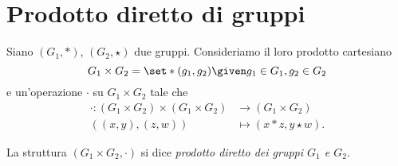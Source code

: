 \section{Prodotto diretto di gruppi}

\begin{definition}
    Siano $(G_1, *)$, $(G_2, \star)$ due gruppi. Consideriamo il loro prodotto cartesiano \[
        G_1 \times G_2 = \set*{(g_1, g_2) \given g_1 \in G_1, g_2 \in G_2}    
    \] e un'operazione $\cdot$ su $G_1 \times G_2$ tale che \begin{align*}
    \cdot : (G_1 \times G_2) \times (G_1 \times G_2) &\to (G_1 \times G_2)\\
    ((x, y), (z, w)) &\mapsto (x * z, y \star w).
    \end{align*}
    
    La struttura $(G_1 \times G_2, \cdot)$ si dice \emph{prodotto diretto dei gruppi $G_1$ e $G_2$}.
\end{definition}

